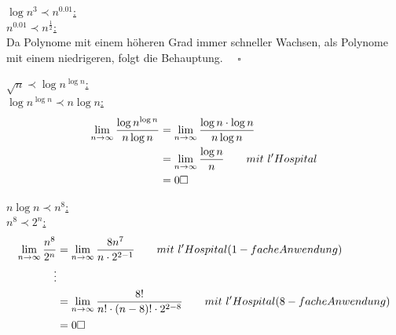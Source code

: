 \documentclass{article}
\begin{document}
\begin{enumerate}
\underline{$\log n^3 \prec n^{0.01}$:} \\

\underline{$n^{0.01} \prec n^{\frac{1}{2}}$:} \\
Da Polynome mit einem höheren Grad immer schneller Wachsen, als
Polynome mit einem niedrigeren, folgt die Behauptung. $\quad \square$

\underline{$\sqrt{n} \prec \log n^{\log n}$:} \\

\underline{$\log n^{\log n} \prec n \log n$:} \\
\begin{align*}
    \lim_{n \to \infty} \frac{\log n^{\log n}}{n \log n} &= \lim_{n \to \infty}
        \frac{\log n \cdot \log n}{n \log n} \\
        &= \lim_{n \to \infty} \frac{\log n}{n} \qquad mit ~ l'Hospital \\
        &= 0 \hfill \square
\end{align*}


\underline{$n \log n \prec n^8$:} \\

\underline{$n^8 \prec 2^n$:} \\
\begin{align*}
    \lim_{n \to \infty} \frac{n^8}{2^n} &= \lim_{n \to \infty}
        \frac{8n^7}{n \cdot 2^{2-1}} \qquad mit ~ l'Hospital (1-fache Anwendung) \\
        \vdots \\
        &= \lim_{n \to \infty} \frac{8!}{n! \cdot (n-8)! \cdot 2^{2-8}} \qquad mit ~ l'Hospital (8-fache Anwendung) \\
        &= 0 \hfill \square
\end{align*}


\end{enumerate}
\end{document}
